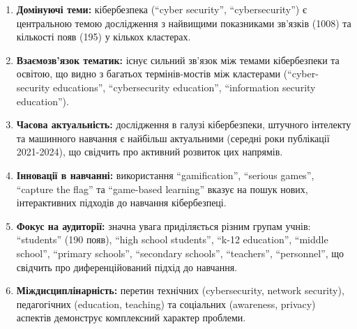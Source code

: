 \begin{enumerate}
    \item \textbf{Домінуючі теми:} кібербезпека (``cyber security'', ``cybersecurity'') є центральною темою дослідження з найвищими показниками зв'язків (1008) та кількості появ (195) у кількох кластерах.
    
    \item \textbf{Взаємозв'язок тематик:} існує сильний зв'язок між темами кібербезпеки та освітою, що видно з багатьох термінів-мостів між кластерами (``cyber-security educations'', ``cybersecurity education'', ``information security education'').
    
    \item \textbf{Часова актуальність:} дослідження в галузі кібербезпеки, штучного інтелекту та машинного навчання є найбільш актуальними (середні роки публікації 2021-2024), що свідчить про активний розвиток цих напрямів.
    
    \item \textbf{Інновації в навчанні:} використання ``gamification'', ``serious games'', ``capture the flag'' та ``game-based learning'' вказує на пошук нових, інтерактивних підходів до навчання кібербезпеці.
    
    \item \textbf{Фокус на аудиторії:} значна увага приділяється різним групам учнів: ``students'' (190 появ), ``high school students'', ``k-12 education'', ``middle school'', ``primary schools'', ``secondary schools'', ``teachers'', ``personnel'', що свідчить про диференційований підхід до навчання.
    
    \item \textbf{Міждисциплінарність:} перетин технічних (cybersecurity, network security), педагогічних (education, teaching) та соціальних (awareness, privacy) аспектів демонструє комплексний характер проблеми.
\end{enumerate}




    
